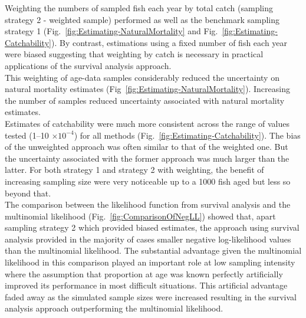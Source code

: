Weighting the numbers of sampled fish each year by total catch (sampling strategy 2 - weighted sample) performed as well as the benchmark sampling strategy 1 (Fig.~\ref{fig:Estimating-NaturalMortality} and Fig.~\ref{fig:Estimating-Catchability}). By contrast, estimations using a fixed number of fish each year were biased suggesting that weighting by catch is necessary in practical applications of the survival analysis approach. \\

This weighting of age-data samples considerably reduced the uncertainty on natural mortality estimates (Fig~\ref{fig:Estimating-NaturalMortality}). Increasing the number of samples reduced uncertainty associated with natural mortality estimates. \\ 

Estimates of catchability were much more consistent across the range of values tested (1--10 $ \times 10^{-4}$) for all methods (Fig.~\ref{fig:Estimating-Catchability}). The bias of the unweighted approach was often similar to that of the weighted one. But the uncertainty associated with the former approach was much larger than the latter. For both strategy 1 and strategy 2 with weighting, the benefit of increasing sampling size were very noticeable up to a 1000 fish aged but less so beyond that.\\

The comparison between the likelihood function from survival analysis and the multinomial likelihood (Fig.~\ref{fig:ComparisonOfNegLL}) showed that, apart sampling strategy 2 which provided biased estimates, the approach using survival analysis provided in the majority of cases smaller negative log-likelihood values than the multinomial likelihood. The substantial advantage given the multinomial likelihood in this comparison played an important role at low sampling intensity where the assumption that proportion at age was known perfectly artificially improved its performance in most difficult situations. This artificial advantage faded away as the simulated sample sizes were increased resulting in the survival analysis approach outperforming the multinomial likelihood. \\

